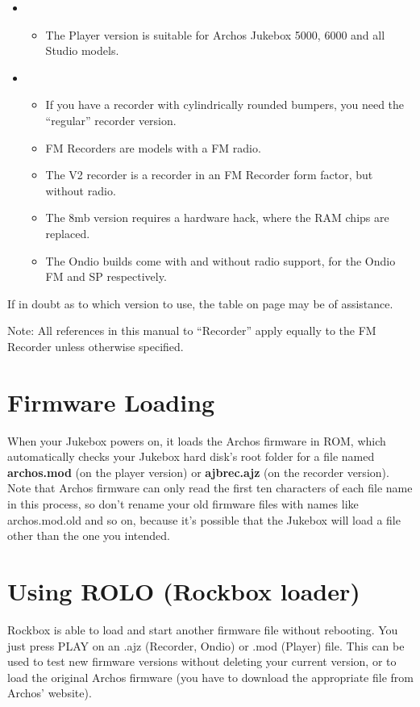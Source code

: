 \begin{itemize}
\item \begin{itemize}
\item The Player version is suitable for Archos Jukebox 5000, 6000 and
all Studio models.
\end{itemize}
\end{itemize}
\begin{itemize}
\item \begin{itemize}
\item If you have a recorder with cylindrically rounded bumpers, you
need the ``regular'' recorder version. 
\item FM Recorders are models with a FM radio.
\item The V2 recorder is a recorder in an FM Recorder form factor, but
without radio. 
\item The 8mb version requires a hardware hack, where the RAM chips are
replaced. 
\item  The Ondio builds come with and without radio support, for the
Ondio FM and SP respectively.
\end{itemize}
\end{itemize}
If in doubt as to which version to use, the table on page
\pageref{ref:Jukeboxtypetable} may be of assistance.

Note: All references in this manual to
``Recorder'' apply equally to the FM Recorder
unless otherwise specified.

\section{\label{ref:FirmwareLoading}Firmware Loading}
When your Jukebox powers on, it loads the Archos firmware in ROM, which
automatically checks your Jukebox hard disk's root folder for a file
named \textbf{archos.mod} (on the player version) or
\textbf{ajbrec.ajz} (on the recorder version). Note that Archos
firmware can only read the first ten characters of each file name in
this process, so don't rename your old firmware files with names like
archos.mod.old and so on, because it's possible that the Jukebox will
load a file other than the one you intended.

\section{\label{ref:PartISection4}Using ROLO (Rockbox loader)}
Rockbox is able to load and start another firmware file without
rebooting. You just press PLAY on an .ajz (Recorder, Ondio) or .mod
(Player) file. This can be used to test new firmware versions without
deleting your current version, or to load the original Archos firmware
(you have to download the appropriate file from
Archos' website). 

